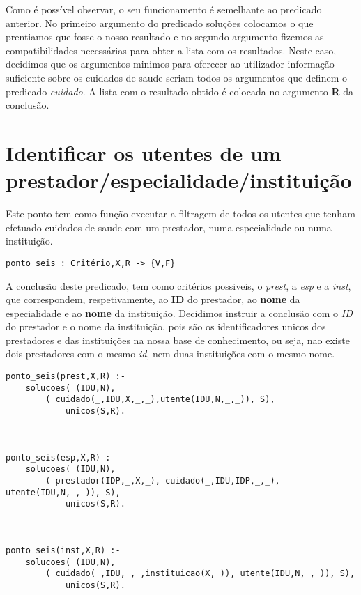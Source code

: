 \documentclass{report}
\def\titulo#1{\section{#1}}
\begin{document}
Como é possível observar, o seu funcionamento é semelhante ao predicado anterior. No primeiro argumento do predicado soluções colocamos o que prentiamos que fosse o nosso resultado e no segundo argumento fizemos as compatibilidades necessárias para obter a lista com os resultados. Neste caso, decidimos que os argumentos minimos para oferecer ao utilizador informação suficiente sobre os cuidados de saude seriam todos os argumentos que definem o predicado \textit{cuidado}. A lista com o resultado obtido é colocada no argumento \textbf{R} da conclusão.



















\titulo{Identificar os utentes de um prestador/especialidade/instituição}

Este ponto tem como função executar a filtragem de todos os utentes que tenham efetuado cuidados de saude com um prestador, numa especialidade ou numa instituição.

\begin{verbatim}
ponto_seis : Critério,X,R -> {V,F}
\end{verbatim}

A conclusão deste predicado, tem como critérios possiveis, o \textit{prest}, a \textit{esp} e a \textit{inst}, que correspondem, respetivamente, ao \textbf{ID} do prestador, ao \textbf{nome} da especialidade e ao \textbf{nome} da instituição. Decidimos instruir a conclusão com o \textit{ID} do prestador e o nome da instituição, pois são os identificadores unicos dos prestadores e das instituições na nossa base de conhecimento, ou seja, nao existe dois prestadores com o mesmo \textit{id}, nem duas instituições com o mesmo nome.

\begin{verbatim}
ponto_seis(prest,X,R) :- 
    solucoes( (IDU,N), 
        ( cuidado(_,IDU,X,_,_),utente(IDU,N,_,_)), S), 
            unicos(S,R).



ponto_seis(esp,X,R) :- 
    solucoes( (IDU,N), 
        ( prestador(IDP,_,X,_), cuidado(_,IDU,IDP,_,_), utente(IDU,N,_,_)), S), 
            unicos(S,R).



ponto_seis(inst,X,R) :- 
    solucoes( (IDU,N), 
        ( cuidado(_,IDU,_,_,instituicao(X,_)), utente(IDU,N,_,_)), S),
            unicos(S,R).
\end{verbatim}
\end{document}
